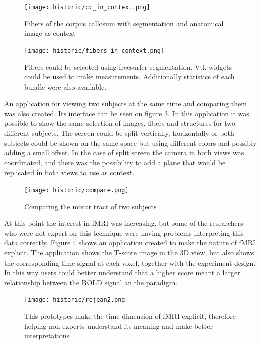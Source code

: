 \begin{figure}
\centering
\texttt{[image: historic/cc\_in\_context.png]}
\caption{\label{fig_cc_ctx_1}Fibers of the corpus callosum with segmentation and anatomical image as context}
\end{figure}

\begin{figure}
\centering
\texttt{[image: historic/fibers\_in\_context.png]}
\caption{\label{fig_fibers_ctx}Fibers could be selected using freesurfer segmentation. Vtk widgets could be used to make measurements.
Additionally statistics of each bundle were also available.}
\end{figure}

An application for viewing two subjects at the same time and comparing them was also created. Its interface can be seen on figure \ref{fig_compare_1}. In this application it was possible to show the same selection of images, fibers and structures for two different subjects. The screen could be split vertically, horizontally or both subjects could be shown on the same space but using different colors and possibly adding a small offset. In the case of split screen the camera in both views was coordinated, and there was the possibility to add a plane that would be replicated in both views to use as context.

\begin{figure}
\centering
\texttt{[image: historic/compare.png]}
\caption{\label{fig_compare_1}Comparing the motor tract of two subjects}
\end{figure}

At this point the interest in fMRI was increasing, but some of the researchers who were not expert on this technique were having problems interpreting this data correctly. Figure \ref{fig_fmri_1} shows an application created to make the nature of fMRI explicit. The application shows the T-score image in the 3D view, but also shows the corresponding time signal at each voxel, together with the experiment design. In this way users could better understand that a higher score meant a larger relationship between the BOLD signal an the paradigm.

\begin{figure}
\centering
\texttt{[image: historic/rejean2.png]}
\caption{\label{fig_fmri_1}This prototypes make the time dimension of fMRI explicit, therefore helping non-experts understand its meaning and make better interpretations}
\end{figure}

